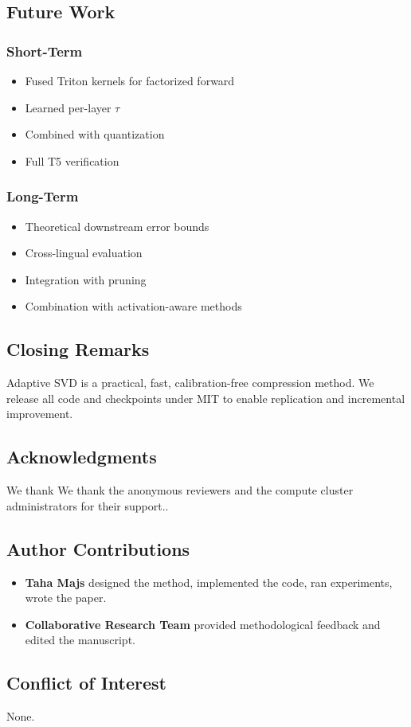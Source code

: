 \subsection{Future Work}

\subsubsection{Short-Term}
\begin{itemize}
\item Fused Triton kernels for factorized forward
\item Learned per-layer $\tau$
\item Combined with quantization
\item Full T5 verification

\end{itemize}
\subsubsection{Long-Term}
\begin{itemize}
\item Theoretical downstream error bounds
\item Cross-lingual evaluation
\item Integration with pruning
\item Combination with activation-aware methods

\end{itemize}
\subsection{Closing Remarks}

Adaptive SVD is a practical, fast, calibration-free compression method. We 
release all code and checkpoints under MIT to enable replication 
and incremental improvement.

\subsection{Acknowledgments}

We thank We thank the anonymous reviewers and the compute cluster administrators for their support..

\subsection{Author Contributions}

\begin{itemize}
\item \textbf{Taha Majs} designed the method, implemented the code, ran experiments,
  wrote the paper.
\item \textbf{Collaborative Research Team} provided methodological feedback and edited the manuscript.

\end{itemize}
\subsection{Conflict of Interest}

None.